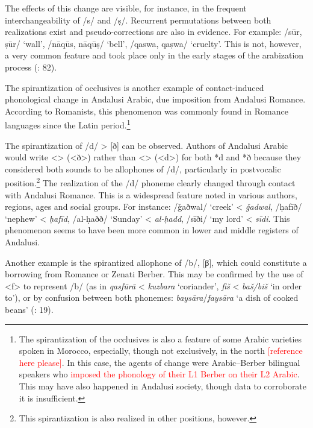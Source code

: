 \documentclass[output=paper,modfonts,nonflat]{langsci/langscibook}
\begin{document}
The effects of this change are visible, for instance, in the frequent interchangeability of /s/ and /ṣ/. Recurrent permutations between both realizations exist and pseudo-corrections are also in evidence. For example: /sūr, ṣūr/ ‘wall’, /nāqūs, nāqūṣ/ ‘bell’, /qaswa, qaṣwa/ ‘cruelty’. This is not, however, a very common feature and took place only in the early stages of the arabization process (\citealt{CorrientePereiraVicente2015}: 82). 

The spirantization of occlusives is another example of contact-induced phonological change in Andalusi Arabic, due imposition from Andalusi Romance. According to Romanists, this phenomenon was commonly found in Romance languages since the Latin period.\footnote{The spirantization of the occlusives is also a feature of some Arabic varieties spoken in Morocco, especially, though not exclusively, in the north \textcolor{red}{[reference here please]}.  In this case, the agents of change were Arabic--Berber bilingual speakers who \textcolor{red}{imposed the phonology of their L1 Berber on their L2 Arabic}. This may have also happened in Andalusi society, though data to corroborate it is insufficient.}

The spirantization of /d/ > [ð] can be observed. Authors of Andalusi Arabic would write <{}> (<ð>) rather than <{}> (<d>) for both *d and *ð because they considered both sounds to be allophones of /d/, particularly in postvocalic position.\footnote{This spirantization is also realized in other positions, however.}  The realization of the /d/ phoneme clearly changed through contact with Andalusi Romance. This is a widespread feature noted in various authors, regions, ages and social groups. For instance: {} /ǧaðwal/ ‘creek’ < \textit{ǧadwal}, {} /ḥafīð/ ‘nephew’ < \textit{ḥafīd}, {} /al-ḥaðð/ ‘Sunday’ < \textit{al-ḥadd}, {} /sīði/ ‘my lord’ < \textit{sīdi}. This phenomenon seems to have been more common in lower and middle registers of Andalusi. 

Another example is the spirantized allophone of /b/, [β], which could constitute a borrowing from Romance or Zenati Berber. This may be confirmed by the use of <f> to represent /b/ (as in \textcolor{red}{{}}  \textit{qasfūrā} < \textit{kuzbara} ‘coriander’, \textcolor{red}{{}}  \textit{fiš} < \textit{baš/biš} ‘in order to’), or by confusion between both phonemes: \textit{baysāra}/\textit{faysāra} ‘a dish of cooked beans’ (\citealt{CorrientePereiraVicente2015}: 19).
 
\end{document}
